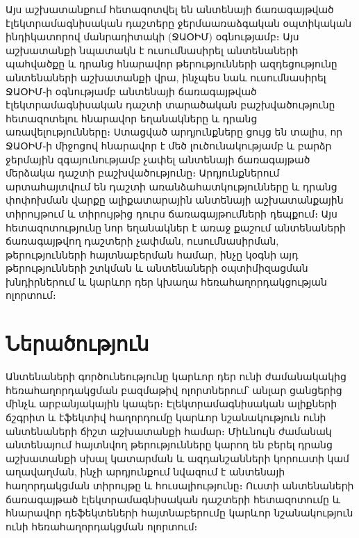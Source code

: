 \documentclass[12pt, fleqn]{report}
\begin{document}

Այս աշխատանքում հետազոտվել են անտենայի ճառագայթված էլեկտրամագնիսական դաշտերը ջերմաառաձգական օպտիկական ինդիկատորով մանրադիտակի (ՋԱՕԻՄ) օգնությամբ։ Այս աշխատանքի նպատակն է ուսումնասիրել անտենաների պահվածքը և դրանց հնարավոր թերությունների ազդեցությունը անտենաների աշխատանքի վրա, ինչպես նաև ուսումնասիրել ՋԱՕԻՄ֊ի օգնությամբ անտենայի ճառագայթված էլեկտրամագնիսական դաշտի տարածական բաշխվածությունը հետազոտելու հնարավոր եղանակները և դրանց առավելությունները։ Ստացված արդյունքները ցույց են տալիս, որ ՋԱՕԻՄ֊ի միջոցով հնարավոր է մեծ լուծունակությամբ և բարձր ջերմային զգայունությամբ չափել անտենայի ճառագայթած մերձակա դաշտի բաշխվածությունը։ Արդյունքներում արտահայտվում են դաշտի առանձահատկությունները և դրանց փոփոխման վարքը ալիքատարային անտենայի աշխատանքային տիրույթում և տիրույթից դուրս ճառագայթումների դեպքում։ Այս հետազոտությունը նոր եղանակներ է առաջ քաշում անտենաների ճառագայթվող դաշտերի չափման, ուսումնասիրման, թերությունների հայտնաբերման համար, ինչը կօգնի այդ թերությունների շտկման և անտենաների օպտիմիզացման խնդիրներում և կարևոր դեր կխաղա հեռահաղորդակցության ոլորտում։

\newpage

\renewcommand{\contentsname}{
    \vspace{-64pt}
    \normalfont\Large\bfseries
    Բովանդակություն
    \vspace{-24pt}
}
\tableofcontents

\newpage

\captionsetup[figure]{name=Նկ․}
\captionsetup{justification=raggedright, width=1.0\textwidth, font=small, format=hang}

\section* {Ներածություն}

Անտենաների գործունեությունը կարևոր դեր ունի ժամանակակից հեռահաղորդակցման բազմաթիվ ոլորտներում՝ անլար ցանցերից մինչև արբանյակային կապեր։ Էլեկտրամագնիսական ալիքների ճշգրիտ և էֆեկտիվ հաղորդումը կարևոր նշանակություն ունի անտենաների ճիշտ աշխատանքի համար։ Միևնույն ժամանակ անտենայում հայտնվող թերությունները կարող են բերել դրանց աշխատանքի սխալ կատարման և ազդանշանների կորուստի կամ աղավաղման, ինչի արդյունքում նվազում է անտենայի հաղորդակցման տիրույթը և հուսալիությունը։ Ուստի անտենաների ճառագայթած էլեկտրամագնիսական դաշտերի հետազոտումը և հնարավոր դեֆեկտեների հայտնաբերումը կարևոր նշանակություն ունի հեռահաղորդակցման ոլորտում։
\end{document}
